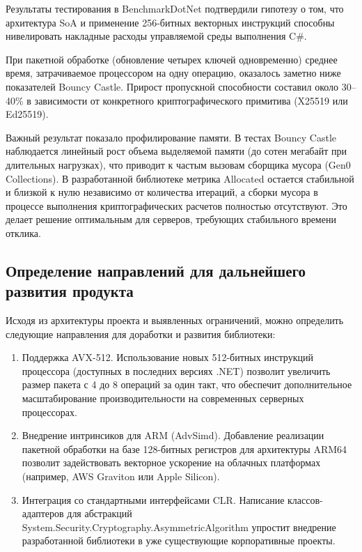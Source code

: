 Результаты тестирования в BenchmarkDotNet подтвердили гипотезу о том, что архитектура SoA и применение 256-битных векторных инструкций способны нивелировать накладные расходы управляемой среды выполнения C\#. 

При пакетной обработке (обновление четырех ключей одновременно) среднее время, затрачиваемое процессором на одну операцию, оказалось заметно ниже показателей Bouncy Castle. 
Прирост пропускной способности составил около 30–40\% в зависимости от конкретного криптографического примитива (X25519 или Ed25519).

Важный результат показало профилирование памяти. В тестах Bouncy Castle наблюдается линейный рост объема выделяемой памяти (до сотен мегабайт при длительных нагрузках), что приводит к частым вызовам сборщика мусора (Gen0 Collections).
В разработанной библиотеке метрика Allocated остается стабильной и близкой к нулю независимо от количества итераций, а сборки мусора в процессе выполнения криптографических расчетов полностью отсутствуют. Это делает решение оптимальным для серверов, требующих стабильного времени отклика.

\subsection{Определение направлений для дальнейшего развития продукта}

Исходя из архитектуры проекта и выявленных ограничений, можно определить следующие направления для доработки и развития библиотеки:

\begin{enumerate}
    \item Поддержка AVX-512. Использование новых 512-битных инструкций процессора (доступных в последних версиях .NET) позволит увеличить размер пакета с 4 до 8 операций за один такт, что обеспечит дополнительное масштабирование производительности на современных серверных процессорах.
    \item Внедрение интринсиков для ARM (AdvSimd). Добавление реализации пакетной обработки на базе 128-битных регистров для архитектуры ARM64 позволит задействовать векторное ускорение на облачных платформах (например, AWS Graviton или Apple Silicon).
    \item Интеграция со стандартными интерфейсами CLR. Написание классов-адаптеров для абстракций System.Security.Cryptography.AsymmetricAlgorithm упростит внедрение разработанной библиотеки в уже существующие корпоративные проекты.
\end{enumerate}